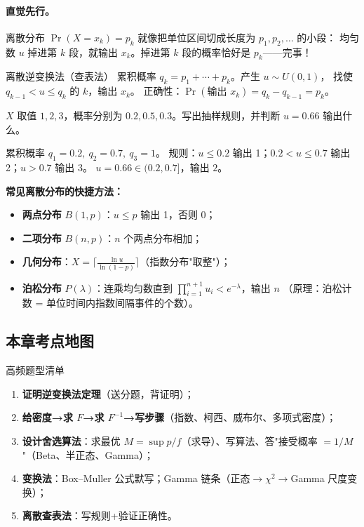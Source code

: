 \paragraph{直觉先行。}
离散分布 $\Pr(X=x_k)=p_k$ 就像把单位区间切成长度为 $p_1,p_2,\dots$ 的小段：
均匀数 $u$ 掉进第 $k$ 段，就输出 $x_k$。掉进第 $k$ 段的概率恰好是 $p_k$——完事！

\begin{ebox}{离散逆变换法（查表法）}
累积概率 $q_k=p_1+\cdots+p_k$。产生 $u\sim U(0,1)$，
找使 $q_{k-1}<u\le q_k$ 的 $k$，输出 $x_k$。
正确性：$\Pr(\text{输出 }x_k)=q_k-q_{k-1}=p_k$。
\end{ebox}

\begin{exbox}[查表法实战]
$X$ 取值 $1,2,3$，概率分别为 $0.2,0.5,0.3$。写出抽样规则，并判断 $u=0.66$ 输出什么。
\end{exbox}
\begin{sol}
累积概率 $q_1=0.2,\ q_2=0.7,\ q_3=1$。
规则：$u\le0.2$ 输出 1；$0.2<u\le0.7$ 输出 2；$u>0.7$ 输出 3。
$u=0.66\in(0.2,0.7]$，输出 $2$。
\end{sol}

\textbf{常见离散分布的快捷方法：}
\begin{itemize}[leftmargin=2em]
  \item \textbf{两点分布} $B(1,p)$：$u\le p$ 输出 1，否则 0；
  \item \textbf{二项分布} $B(n,p)$：$n$ 个两点分布相加；
  \item \textbf{几何分布}：$X=\big\lceil\frac{\ln u}{\ln(1-p)}\big\rceil$（指数分布"取整"）；
  \item \textbf{泊松分布} $P(\lambda)$：连乘均匀数直到 $\prod_{i=1}^{n+1}u_i<e^{-\lambda}$，输出 $n$
  （原理：泊松计数 = 单位时间内指数间隔事件的个数）。
\end{itemize}

\subsection{本章考点地图}

\begin{ebox}{高频题型清单}
\begin{enumerate}[leftmargin=2em]
  \item \textbf{证明逆变换法定理}（送分题，背证明）；
  \item \textbf{给密度→求 $F$→求 $F^{-1}$→写步骤}（指数、柯西、威布尔、多项式密度）；
  \item \textbf{设计舍选算法}：求最优 $M=\sup p/f$（求导）、写算法、答"接受概率 $=1/M$"（Beta、半正态、Gamma）；
  \item \textbf{变换法}：Box--Muller 公式默写；Gamma 链条（正态$\to\chi^2\to$Gamma 尺度变换）；
  \item \textbf{离散查表法}：写规则+验证正确性。
\end{enumerate}
\end{ebox}
